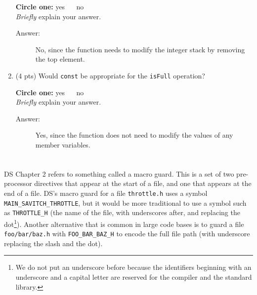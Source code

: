 \documentclass[11pt]{article}
\begin{document}
\begin{enumerate}
\textbf{Circle one:} yes \(\quad\) no \\ 
 \emph{Briefly} explain your answer. 

 \begin{description}
   \item[Answer:] No, since the function needs to modify the integer stack by removing the top element.
 \end{description}

\vspace{4em}
\item (4 pts) Would \texttt{const} be appropriate for the \texttt{isFull} operation?

\textbf{Circle one:} yes \(\quad\) no \\ 
 \emph{Briefly} explain your answer. 

 \begin{description}
  \item[Answer:] Yes, since the function does not need to modify the values of any member variables.
\end{description}
\vspace{4em}
\end{enumerate}

\section{}
\label{sec:org81d0200}

DS Chapter 2 refers to something called a macro guard. This is a set
of two pre-processor directives that appear at the start of a file,
and one that appears at the end of a file. DS's macro guard for a
file \texttt{throttle.h} uses a symbol \texttt{MAIN\_SAVITCH\_THROTTLE}, but it
would be more traditional to use a symbol such as \texttt{THROTTLE\_H} (the
name of the file, with underscores after, and replacing the
dot\footnote{We do not put an underscore before because the identifiers
beginning with an underscore and a capital letter are reserved for
the compiler and the standard library.}). Another alternative that
is common in large code bases is to guard a file \texttt{foo/bar/baz.h}
with \texttt{FOO\_BAR\_BAZ\_H} to encode the full file path (with underscore
replacing the slash and the dot).
\end{document}
